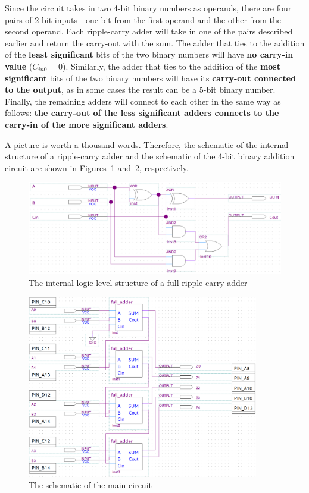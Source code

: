 \documentclass[12pt]{article}
\begin{document}
Since the circuit takes in two 4-bit binary numbers as operands, there are four pairs of 2-bit inputs---one bit from the first operand and the other from the second operand. Each ripple-carry adder will take in one of the pairs described earlier and return the carry-out with the sum. The adder that ties to the addition of the \textbf{least significant} bits of the two binary numbers will have \textbf{no carry-in value} ($C_{in0} = 0$). Similarly, the adder that ties to the addition of the \textbf{most significant} bits of the two binary numbers will have its \textbf{carry-out connected to the output}, as in some cases the result can be a 5-bit binary number. Finally, the remaining adders will connect to each other in the same way as follows: \textbf{the carry-out of the less significant adders connects to the carry-in of the more significant adders}.

A picture is worth a thousand words. Therefore, the schematic of the internal structure of a ripple-carry adder and the schematic of the 4-bit binary addition circuit are shown in Figures~\ref{figure:2} and~\ref{figure:3}, respectively.

\begin{figure}
    \centering
    \includegraphics[width=\textwidth]{full_adder_schematic.png}
    \caption{The internal logic-level structure of a full ripple-carry adder}
    \label{figure:2}
\end{figure}

\begin{figure}
    \centering
    \includegraphics[width=0.9\textwidth]{schematic.png}
    \caption{The schematic of the main circuit}
    \label{figure:3}
\end{figure}
\end{document}
